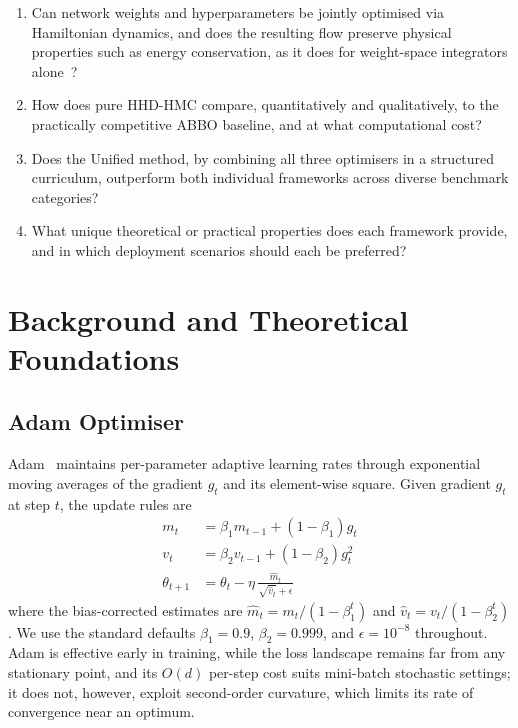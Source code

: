 \documentclass[11pt]{article}
\theoremstyle{definition}
\begin{document}
\begin{enumerate}[leftmargin=*, label=\textbf{RQ\arabic*.}]
\item Can network weights and hyperparameters be jointly optimised
      via Hamiltonian dynamics, and does the resulting flow preserve
      physical properties such as energy conservation, as it does
      for weight-space integrators alone~\cite{duruisseaux2021adaptive}?
\item How does pure HHD-HMC compare, quantitatively and qualitatively, to
      the practically competitive ABBO baseline, and at what
      computational cost?
\item Does the Unified method, by combining all three optimisers in
      a structured curriculum, outperform both individual frameworks
      across diverse benchmark categories?
\item What unique theoretical or practical properties does each
      framework provide, and in which deployment scenarios should
      each be preferred?
\end{enumerate}


\section{Background and Theoretical Foundations}

\subsection{Adam Optimiser}

Adam~\cite{kingma2015adam} maintains per-parameter adaptive learning
rates through exponential moving averages of the gradient $g_t$ and
its element-wise square. Given gradient $g_t$ at step $t$, the
update rules are
\begin{align}
m_t &= \beta_1 m_{t-1} + (1-\beta_1)g_t \label{eq:adam1}\\
v_t &= \beta_2 v_{t-1} + (1-\beta_2)g_t^2 \label{eq:adam2}\\
\theta_{t+1} &= \theta_t - \eta\,\frac{\hat{m}_t}{\sqrt{\hat{v}_t}+\epsilon}
\label{eq:adam3}
\end{align}
where the bias-corrected estimates are $\hat{m}_t = m_t/(1-\beta_1^t)$
and $\hat{v}_t = v_t/(1-\beta_2^t)$. We use the standard defaults
$\beta_1 = 0.9$, $\beta_2 = 0.999$, and $\epsilon = 10^{-8}$
throughout. Adam is effective early in training, while the loss
landscape remains far from any stationary point, and its $O(d)$
per-step cost suits mini-batch stochastic settings; it does not,
however, exploit second-order curvature, which limits its rate of
convergence near an optimum.
\end{document}
